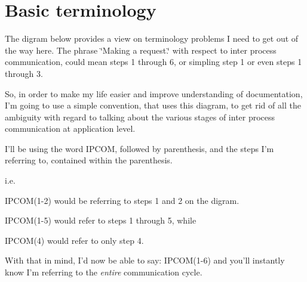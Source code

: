 \section*{Basic terminology}

The digram below provides a view on terminology problems I need to get out of the way here. The phrase \char`\"{}\-Making a request.\char`\"{} with respect to inter process communication, could mean steps 1 through 6, or simpling step 1 or even steps 1 through 3.

So, in order to make my life easier and improve understanding of documentation, I'm going to use a simple convention, that uses this diagram, to get rid of all the ambiguity with regard to talking about the various stages of inter process communication at application level.

I'll be using the word I\-P\-C\-O\-M, followed by parenthesis, and the steps I'm referring to, contained within the parenthesis.

i.\-e.


\begin{DoxyItemize}
\item I\-P\-C\-O\-M(1-\/2) would be referring to steps 1 and 2 on the digram.
\item I\-P\-C\-O\-M(1-\/5) would refer to steps 1 through 5, while
\item I\-P\-C\-O\-M(4) would refer to only step 4.
\end{DoxyItemize}

With that in mind, I'd now be able to say\-: I\-P\-C\-O\-M(1-\/6) and you'll instantly know I'm referring to the {\itshape entire} communication cycle.

 
